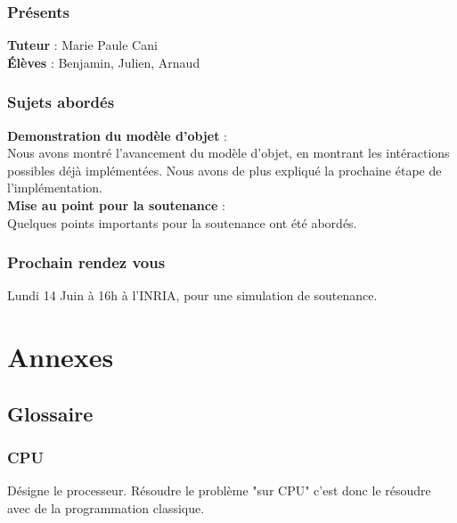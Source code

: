 \documentclass[a4paper,10pt]{article}
\begin{document}
\subsubsection{Présents}
\textbf{Tuteur} : Marie Paule Cani\\
\textbf{Élèves} : Benjamin, Julien, Arnaud \\

\subsubsection{Sujets abordés}

\textbf{Demonstration du modèle d'objet} :  \\
    Nous avons montré l'avancement du modèle d'objet, en montrant les intéractions
    possibles déjà implémentées. Nous avons de plus expliqué la prochaine étape de
    l'implémentation.\\
    
    
\textbf{Mise au point pour la soutenance} :  \\
    Quelques points importants pour la soutenance ont été abordés.\\
     
    
\subsubsection{Prochain rendez vous}
    Lundi 14 Juin à 16h à l'INRIA, pour une simulation de soutenance.\\









\section{Annexes}

\subsection{Glossaire}

\subsubsection{CPU}
Désigne le processeur. Résoudre le problème "sur CPU" c'est donc le résoudre avec
de la programmation classique.
\end{document}
